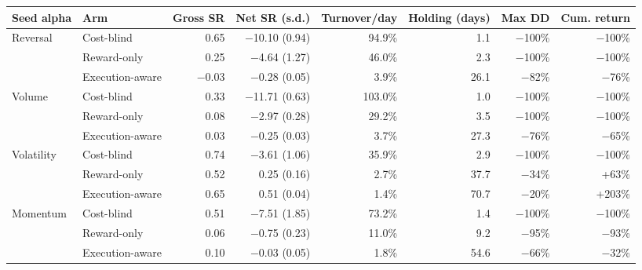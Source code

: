 \begin{tabular}{llrrrrrr}
\toprule
Seed alpha & Arm & Gross SR & Net SR (s.d.) & Turnover/day & Holding (days) & Max DD & Cum. return \\
\midrule
Reversal & Cost-blind & 0.65 & $-$10.10 (0.94) & 94.9\% & 1.1 & $-$100\% & $-$100\% \\
 & Reward-only & 0.25 & $-$4.64 (1.27) & 46.0\% & 2.3 & $-$100\% & $-$100\% \\
 & Execution-aware & $-$0.03 & $-$0.28 (0.05) & 3.9\% & 26.1 & $-$82\% & $-$76\% \\
\addlinespace
Volume & Cost-blind & 0.33 & $-$11.71 (0.63) & 103.0\% & 1.0 & $-$100\% & $-$100\% \\
 & Reward-only & 0.08 & $-$2.97 (0.28) & 29.2\% & 3.5 & $-$100\% & $-$100\% \\
 & Execution-aware & 0.03 & $-$0.25 (0.03) & 3.7\% & 27.3 & $-$76\% & $-$65\% \\
\addlinespace
Volatility & Cost-blind & 0.74 & $-$3.61 (1.06) & 35.9\% & 2.9 & $-$100\% & $-$100\% \\
 & Reward-only & 0.52 & 0.25 (0.16) & 2.7\% & 37.7 & $-$34\% & +63\% \\
 & Execution-aware & 0.65 & 0.51 (0.04) & 1.4\% & 70.7 & $-$20\% & +203\% \\
\addlinespace
Momentum & Cost-blind & 0.51 & $-$7.51 (1.85) & 73.2\% & 1.4 & $-$100\% & $-$100\% \\
 & Reward-only & 0.06 & $-$0.75 (0.23) & 11.0\% & 9.2 & $-$95\% & $-$93\% \\
 & Execution-aware & 0.10 & $-$0.03 (0.05) & 1.8\% & 54.6 & $-$66\% & $-$32\% \\
\bottomrule
\end{tabular}
